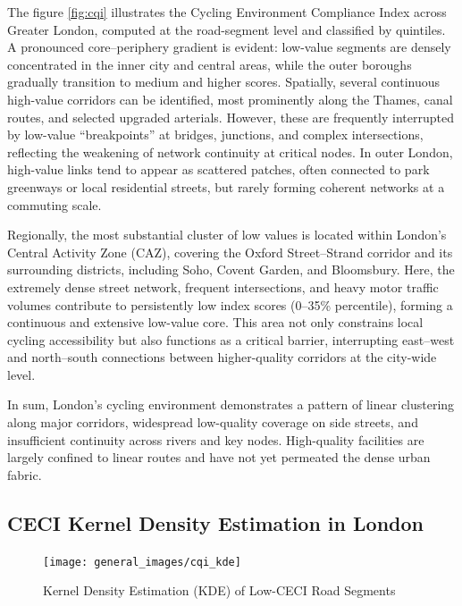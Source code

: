 \documentclass[
  12pt,
  oneside]{book}
\begin{document}
The figure \ref{fig:cqi} illustrates the Cycling Environment Compliance Index across Greater London, computed at the road-segment level and classified by quintiles. A pronounced core--periphery gradient is evident: low-value segments are densely concentrated in the inner city and central areas, while the outer boroughs gradually transition to medium and higher scores. Spatially, several continuous high-value corridors can be identified, most prominently along the Thames, canal routes, and selected upgraded arterials. However, these are frequently interrupted by low-value ``breakpoints'' at bridges, junctions, and complex intersections, reflecting the weakening of network continuity at critical nodes. In outer London, high-value links tend to appear as scattered patches, often connected to park greenways or local residential streets, but rarely forming coherent networks at a commuting scale.

Regionally, the most substantial cluster of low values is located within London's Central Activity Zone (CAZ), covering the Oxford Street--Strand corridor and its surrounding districts, including Soho, Covent Garden, and Bloomsbury. Here, the extremely dense street network, frequent intersections, and heavy motor traffic volumes contribute to persistently low index scores (0--35\% percentile), forming a continuous and extensive low-value core. This area not only constrains local cycling accessibility but also functions as a critical barrier, interrupting east--west and north--south connections between higher-quality corridors at the city-wide level.

In sum, London's cycling environment demonstrates a pattern of linear clustering along major corridors, widespread low-quality coverage on side streets, and insufficient continuity across rivers and key nodes. High-quality facilities are largely confined to linear routes and have not yet permeated the dense urban fabric.

\subsection{CECI Kernel Density Estimation in London}\label{ceci-kernel-density-estimation-in-london}

\begin{figure}

{\centering \texttt{[image: general\_images/cqi\_kde]} 

}

\caption{Kernel Density Estimation (KDE) of Low-CECI Road Segments}\label{fig:kde}
\end{figure}
\end{document}
